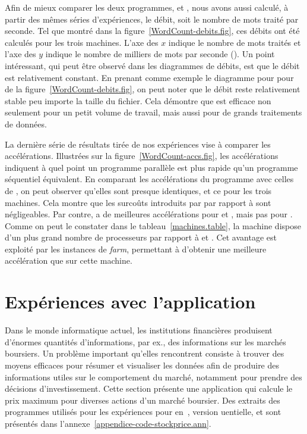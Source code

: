 Afin de mieux comparer les deux programmes,  et , nous avons aussi calculé, à partir des mêmes séries d'exp\'eriences, le d\'ebit, soit le nombre de mots trait\'e par seconde. Tel que montr\'e dans la figure~\ref{WordCount-debits.fig}, ces débits ont \'et\'e calculés pour les trois machines. L'axe des $x$ indique le nombre de mots trait\'es et l'axe des $y$ indique le nombre de milliers de mots par seconde (). Un point int\'eressant, qui peut \^etre observ\'e dans les diagrammes de d\'ebits, est que le d\'ebit est relativement constant. En prenant comme exemple le diagramme pour  pour  de la figure~\ref{WordCount-debits.fig}, on peut noter que le d\'ebit reste relativement stable peu importe la taille du fichier. Cela d\'emontre que  est efficace non seulement pour un petit volume de travail, mais aussi pour de grands traitements de donn\'ees.


La derni\`ere s\'erie de résultats tirée de nos exp\'eriences vise \`a comparer les acc\'el\'erations. Illustr\'ees sur la figure~\ref{WordCount-accs.fig}, les acc\'el\'erations indiquent \`a quel point un programme parall\`ele est plus rapide qu'un programme s\'equentiel \'equivalent. En comparant les acc\'el\'erations du programme  avec celles de , on peut observer qu'elles sont presque identiques, et ce pour les trois machines. Cela montre que les surco\^uts introduits par  par rapport \`a  sont n\'egligeables. Par contre,  a de meilleures acc\'el\'erations pour  et , mais pas pour . Comme on peut le constater dans le tableau~\ref{machines.table}, la machine  dispose d'un plus grand nombre de processeurs par rapport \`a  et . Cet avantage est exploit\'e par les instances de \emph{farm}, permettant \`a  d'obtenir une meilleure acc\'el\'eration que  sur cette machine.



\section{Expériences avec l'application }
\label{stockprice.sect}

Dans le monde informatique actuel, les institutions financi\`eres produisent d'\'enormes quantit\'es d'informations, par ex., des informations sur les march\'es boursiers. Un probl\`eme important qu'elles rencontrent consiste \`a trouver des moyens efficaces pour r\'esumer et visualiser les donn\'ees afin de produire des informations utiles sur le comportement du march\'e, notamment pour prendre des d\'ecisions d'investissement. Cette section pr\'esente une application qui calcule le prix maximum pour diverses actions d'un marché boursier. Des extraits des programmes utilis\'es pour les exp\'eriences pour  en~,  version uentielle,  et  sont pr\'esent\'es dans l'annexe~\ref{appendice-code-stockprice.ann}.


